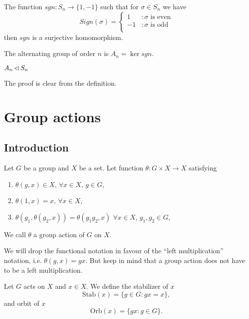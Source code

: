 \documentclass[12pt]{article}
\newcommand\stab{\text{Stab}}
\newcommand\orb{\text{Orb}}
\begin{document}
	\begin{theorem}
		The function $sgn:S_n \to \{1,-1\}$ such that for $\sigma \in S_n$ we have
		$$
		Sign(\sigma) = 
		\begin{cases}
			1 &: \sigma \text{ is even}\\
			-1 &: \sigma \text{ is odd}\\
		\end{cases}
		$$
		then $sgn$ is a surjective homomorphism.
	\end{theorem}

	\begin{define}
		The alternating group of order $n$ is $A_n = \ker sgn$.
	\end{define}

	\begin{theorem}
		$A_n \operatorname{\vartriangleleft} S_n$
	\end{theorem}
	The proof is clear from the definition.

\newpage
\section{Group actions}
\subsection{Introduction}
	\begin{define}\label{group-action-definition}
		Let $G$ be a group and $X$ be a set. Let function $\theta : G\times X \to X$ satisfying 
		\begin{enumerate}
			\item $\theta(g,x) \in X$, $\forall x\in X$, $g\in G$, 

			\item $\theta(1,x)=x$, $\forall x\in X$,

			\item $\theta(g_1,\theta(g_2,x)) = \theta(g_1g_2,x)$ $\forall x\in X$, $g_1,g_2\in G$,  
		\end{enumerate}
		
		We call $\theta$ a group action of $G$ on $X$.
	\end{define}

	We will drop the functional notation in favour of the ``left multiplication'' notation, i.e. $\theta(g,x) = gx$. But keep in mind that a group action does not have to be a left multiplication.

	\begin{define}
		Let $G$ acts on $X$ and $x\in X$. We define the stabilizer of $x$ 
		$$\stab(x) = \{g\in G : gx=x\},$$
		and orbit of $x$
		$$\orb(x) = \{gx : g\in G\}.$$
	\end{define}
\end{document}
